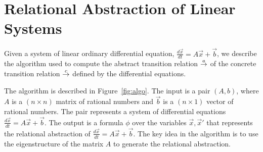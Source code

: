 \documentclass{llncs}
\begin{document}
\section{Relational Abstraction of Linear Systems}

Given a system of linear ordinary differential equation,
$\frac{d\vec{x}}{dt} = A\vec{x}+\vec{b}$, we describe the
algorithm used to compute the abstract transition relation
${\stackrel{a}{\rightarrow}}$ of the concrete transition relation ${\stackrel{c}{\rightarrow}}$ defined
by the differential equations.

The algorithm is described in Figure~\ref{fig:algo}.  
The input is a pair $(A,b)$, where
$A$ is a $(n\times n)$ matrix of rational numbers
and $\vec{b}$ is a $(n\times 1)$ vector of rational numbers.
The pair represents a system of differential equations
$\frac{d\vec{x}}{dt} = A\vec{x}+\vec{b}$.
The output is a formula $\phi$ over the variables
$\vec{x},\vec{x}'$ that represents the relational
abstraction of $\frac{d\vec{x}}{dt} = A\vec{x}+\vec{b}$.
The key idea in the algorithm is to use 
the eigenstructure of the matrix $A$ to generate the
relational abstraction.
\end{document}
